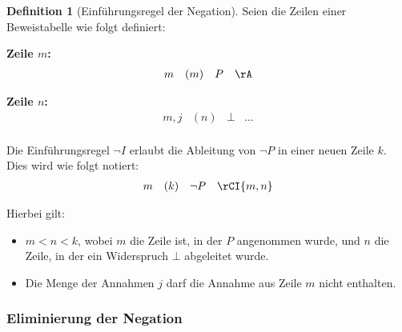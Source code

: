 \documentclass{book}
\theoremstyle{plain}
\theoremstyle{remark}
\theoremstyle{definition}
\newtheorem{definition}{Definition}[section]
\begin{document}
\begin{definition}[Einführungsregel der Negation]
Seien die Zeilen einer Beweistabelle wie folgt definiert:

\textbf{Zeile \(m\):}
\[
\begin{array}{llll}
    m & (m) & P & \rA \\
\end{array}
\]

\textbf{Zeile \(n\):}
\[
\begin{array}{llll}
    m,j & (n) & \bot & \dots \\
\end{array}
\]

Die Einführungsregel \(\neg I\) erlaubt die Ableitung von \(\neg P\) in einer neuen Zeile \(k\). Dies wird wie folgt notiert:
\[
\begin{array}{llll}
    m & (k) & \neg P & \rCI{m,n} \\
\end{array}
\]

Hierbei gilt:
\begin{itemize}
    \item \(m < n < k\), wobei \(m\) die Zeile ist, in der \(P\) angenommen wurde, und \(n\) die Zeile, in der ein Widerspruch \(\bot\) abgeleitet wurde.
    \item Die Menge der Annahmen \(j\) darf die Annahme aus Zeile \(m\) nicht enthalten.
\end{itemize}
\end{definition}

\subsubsection{Eliminierung der Negation}
\label{rule:CE}
\end{document}
